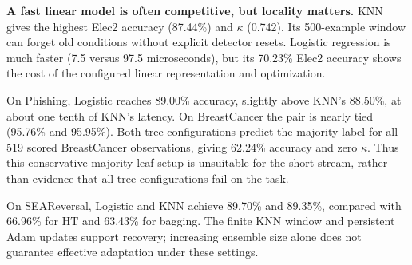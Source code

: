 \textbf{A fast linear model is often competitive, but locality matters.} KNN gives the highest Elec2 accuracy (87.44\%) and $\kappa$ (0.742). Its 500-example window can forget old conditions without explicit detector resets. Logistic regression is much faster (7.5 versus 97.5 microseconds), but its 70.23\% Elec2 accuracy shows the cost of the configured linear representation and optimization.

On Phishing, Logistic reaches 89.00\% accuracy, slightly above KNN's 88.50\%, at about one tenth of KNN's latency. On BreastCancer the pair is nearly tied (95.76\% and 95.95\%). Both tree configurations predict the majority label for all 519 scored BreastCancer observations, giving 62.24\% accuracy and zero $\kappa$. Thus this conservative majority-leaf setup is unsuitable for the short stream, rather than evidence that all tree configurations fail on the task.

On SEAReversal, Logistic and KNN achieve 89.70\% and 89.35\%, compared with 66.96\% for HT and 63.43\% for bagging. The finite KNN window and persistent Adam updates support recovery; increasing ensemble size alone does not guarantee effective adaptation under these settings.
